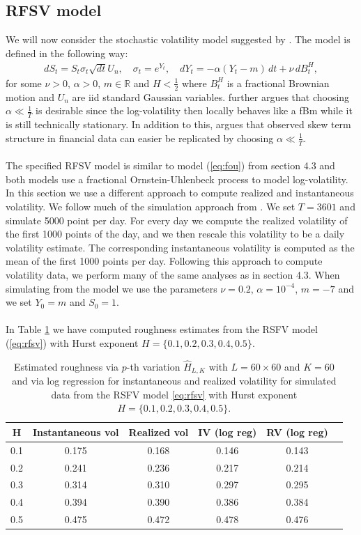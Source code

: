 \documentclass{article}
\begin{document}
\subsection{RFSV model}
We will now consider the stochastic volatility model suggested by \cite{gatheral}. The model is defined in the following way:
\begin{align}
dS_t = S_t \sigma_t \sqrt{dt}U_n, \quad \sigma_t = e^{Y_t}, \quad dY_t = -\alpha (Y_t-m) \, dt + \nu \, dB^H_t, \label{eq:rfsv}
\end{align}
for some $\nu>0$, $\alpha>0$, $m\in\mathbb{R}$ and $H<\frac{1}{2}$ where $B^H_t$ is a fractional Brownian motion and $U_n$ are iid standard Gaussian variables. \cite{gatheral} further argues that choosing $\alpha \ll \frac{1}{T}$ is desirable since the log-volatility then locally behaves like a fBm while it is still technically stationary. In addition to this, \cite{gatheral} argues that observed skew term structure in financial data can easier be replicated by choosing $\alpha \ll \frac{1}{T}$.\\\\
The specified RFSV model is similar to model (\ref{eq:fou}) from section 4.3 and both models use a fractional Ornstein-Uhlenbeck process to model log-volatility. In this section we use a different approach to compute realized and instantaneous volatility. We follow much of the simulation approach from \cite{gatheral}. We set $T=3601$ and simulate 5000 point per day. For every day we compute the realized volatility of the first 1000 points of the day, and we then rescale this volatility to be a daily volatility estimate. The corresponding instantaneous volatility is computed as the mean of the first 1000 points per day. Following this approach to compute volatility data, we perform many of the same analyses as in section 4.3. When simulating from the model we use the parameters $\nu = 0.2$, $\alpha = 10^{-4}$, $m = -7$ and we set $Y_0=m$ and $S_0 = 1$.\\\\
In Table \ref{tab:ex8table} we have computed roughness estimates from the RSFV model (\ref{eq:rfsv}) with Hurst exponent $H= \{0.1,0.2,0.3,0.4,0.5\}$.
\begin{table}[htbp]
    \centering
    \begin{tabular}{cccccc}
        \toprule
        H & Instantaneous vol & Realized vol & IV (log reg) & RV (log reg)\\
        \midrule
        0.1 & 0.175 & 0.168 & 0.146 & 0.143\\
        0.2 & 0.241 & 0.236 & 0.217 & 0.214\\
        0.3 & 0.314 & 0.310 & 0.297 & 0.295\\
        0.4 & 0.394 & 0.390 & 0.386 & 0.384\\
        0.5 & 0.475 & 0.472 & 0.478 & 0.476\\
        \bottomrule
    \end{tabular}
    \caption{Estimated roughness via $p$-th variation $\hat{H}_{L,K}$ with $L=60\times60$ and $K=60$ and via log regression for instantaneous and realized volatility for simulated data from the RSFV model \eqref{eq:rfsv} with Hurst exponent $H=\{0.1,0.2,0.3,0.4,0.5\}$.}
    \label{tab:ex8table}
\end{table}
\end{document}
